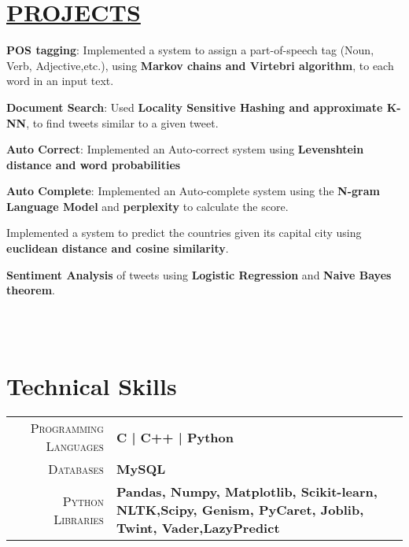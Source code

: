 \documentclass[]{deedy-resume-openfont}
\begin{document}
\hfill
\begin{minipage}[t]{0.66\textwidth} 



\section{\href{https://github.com/SPOOKBITE/NLP_PROJECTS}{PROJECTS}}

\vspace{\topsep} %
\begin{tightemize}
\item \textbf{POS tagging}: Implemented a system to assign a part-of-speech tag (Noun, Verb, Adjective,etc.), using \textbf{Markov chains and Virtebri algorithm}, to each word in an input text.
\item \textbf{Document Search}: Used \textbf{Locality Sensitive Hashing and approximate K-NN}, to find tweets similar to a given tweet.
\item \textbf{Auto Correct}: Implemented an Auto-correct system using \textbf{Levenshtein distance and word probabilities}
\item \textbf{Auto Complete}: Implemented an Auto-complete system using the \textbf{N-gram Language Model} and \textbf{perplexity} to calculate the score.
\item Implemented a system to predict the countries given its capital city using \textbf{euclidean distance and cosine similarity}.
\item \textbf{Sentiment Analysis} of tweets using \textbf{Logistic Regression} and \textbf{Naive Bayes theorem}.
\end{tightemize}


\\~\\



\section{Technical Skills}
\begin{tabular}{r|p{15cm}}
\textsc{Programming Languages} & \textbf{ C | C++ | Python } \\
\textsc{Databases} & \textbf{ MySQL }\\
\textsc{Python Libraries} & \textbf{Pandas, Numpy, Matplotlib, Scikit-learn, NLTK,\newline Scipy, Genism, PyCaret, Joblib, Twint, Vader,\newline LazyPredict}\\ 
\end{tabular}


\end{minipage}
\end{document}
